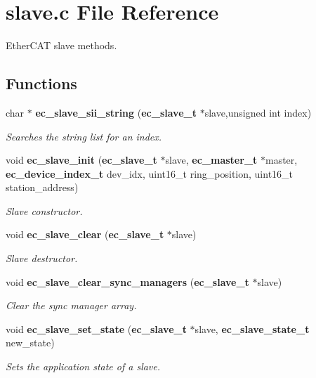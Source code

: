 \section{slave.\-c \-File \-Reference}
\label{slave_8c}


\-Ether\-C\-A\-T slave methods.  


\subsection*{\-Functions}
\begin{DoxyCompactItemize}
\item 
char $\ast$ {\bf ec\-\_\-slave\-\_\-sii\-\_\-string} ({\bf ec\-\_\-slave\-\_\-t} $\ast$slave,unsigned int index)
\begin{DoxyCompactList}\small\item\em \-Searches the string list for an index. \end{DoxyCompactList}\item 
void {\bf ec\-\_\-slave\-\_\-init} ({\bf ec\-\_\-slave\-\_\-t} $\ast$slave, {\bf ec\-\_\-master\-\_\-t} $\ast$master, {\bf ec\-\_\-device\-\_\-index\-\_\-t} dev\-\_\-idx, uint16\-\_\-t ring\-\_\-position, uint16\-\_\-t station\-\_\-address)
\begin{DoxyCompactList}\small\item\em \-Slave constructor. \end{DoxyCompactList}\item 
void {\bf ec\-\_\-slave\-\_\-clear} ({\bf ec\-\_\-slave\-\_\-t} $\ast$slave)
\begin{DoxyCompactList}\small\item\em \-Slave destructor. \end{DoxyCompactList}\item 
void {\bf ec\-\_\-slave\-\_\-clear\-\_\-sync\-\_\-managers} ({\bf ec\-\_\-slave\-\_\-t} $\ast$slave)
\begin{DoxyCompactList}\small\item\em \-Clear the sync manager array. \end{DoxyCompactList}\item 
void {\bf ec\-\_\-slave\-\_\-set\-\_\-state} ({\bf ec\-\_\-slave\-\_\-t} $\ast$slave, {\bf ec\-\_\-slave\-\_\-state\-\_\-t} new\-\_\-state)
\begin{DoxyCompactList}\small\item\em \-Sets the application state of a slave. \end{DoxyCompactList}\item 

\end{DoxyCompactItemize}
